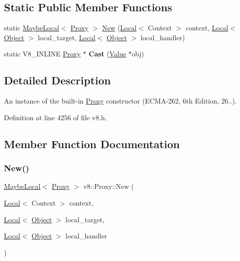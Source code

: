 \subsection*{Static Public Member Functions}
\begin{DoxyCompactItemize}
\item 
static \mbox{\hyperlink{classv8_1_1MaybeLocal}{Maybe\+Local}}$<$ \mbox{\hyperlink{classv8_1_1Proxy}{Proxy}} $>$ \mbox{\hyperlink{classv8_1_1Proxy_a08984acd4a8a94f125afd76b317f66ea}{New}} (\mbox{\hyperlink{classv8_1_1Local}{Local}}$<$ Context $>$ context, \mbox{\hyperlink{classv8_1_1Local}{Local}}$<$ \mbox{\hyperlink{classv8_1_1Object}{Object}} $>$ local\+\_\+target, \mbox{\hyperlink{classv8_1_1Local}{Local}}$<$ \mbox{\hyperlink{classv8_1_1Object}{Object}} $>$ local\+\_\+handler)
\item 
\mbox{\label{classv8_1_1Proxy_a6562478fdedab6fa0fe20ede066b2a78}} 
static V8\+\_\+\+I\+N\+L\+I\+NE \mbox{\hyperlink{classv8_1_1Proxy}{Proxy}} $\ast$ {\bfseries Cast} (\mbox{\hyperlink{classv8_1_1Value}{Value}} $\ast$obj)
\end{DoxyCompactItemize}


\subsection{Detailed Description}
An instance of the built-\/in \mbox{\hyperlink{classv8_1_1Proxy}{Proxy}} constructor (E\+C\+M\+A-\/262, 6th Edition, 26..). 

Definition at line 4256 of file v8.\+h.



\subsection{Member Function Documentation}
\mbox{\label{classv8_1_1Proxy_a08984acd4a8a94f125afd76b317f66ea}} 
\subsubsection{\texorpdfstring{New()}{New()}}
{\footnotesize\ttfamily \mbox{\hyperlink{classv8_1_1MaybeLocal}{Maybe\+Local}}$<$ \mbox{\hyperlink{classv8_1_1Proxy}{Proxy}} $>$ v8\+::\+Proxy\+::\+New (\begin{DoxyParamCaption}\item[{\mbox{\hyperlink{classv8_1_1Local}{Local}}$<$ Context $>$}]{context,  }\item[{\mbox{\hyperlink{classv8_1_1Local}{Local}}$<$ \mbox{\hyperlink{classv8_1_1Object}{Object}} $>$}]{local\+\_\+target,  }\item[{\mbox{\hyperlink{classv8_1_1Local}{Local}}$<$ \mbox{\hyperlink{classv8_1_1Object}{Object}} $>$}]{local\+\_\+handler }\end{DoxyParamCaption})\hspace{0.3cm}{\ttfamily [static]}}

